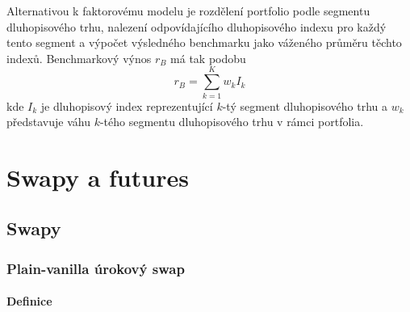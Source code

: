 \documentclass[a4paper]{book}
\begin{document}
Alternativou k faktorovému modelu je rozdělení portfolio podle segmentu dluhopisového trhu, nalezení odpovídajícího dluhopisového indexu pro každý tento segment a výpočet výsledného benchmarku jako váženého průměru těchto indexů. Benchmarkový výnos $r_B$ má tak podobu
\begin{equation*}
r_B = \sum_{k=1}^K w_k I_k
\end{equation*}
kde $I_k$ je dluhopisový index reprezentující $k$-tý segment dluhopisového trhu a $w_k$ představuje váhu $k$-tého segmentu dluhopisového trhu v rámci portfolia.

\part{Swapy a futures}

\chapter{Swapy}

\section{Plain-vanilla úrokový swap}

\subsection{Definice}
\end{document}
